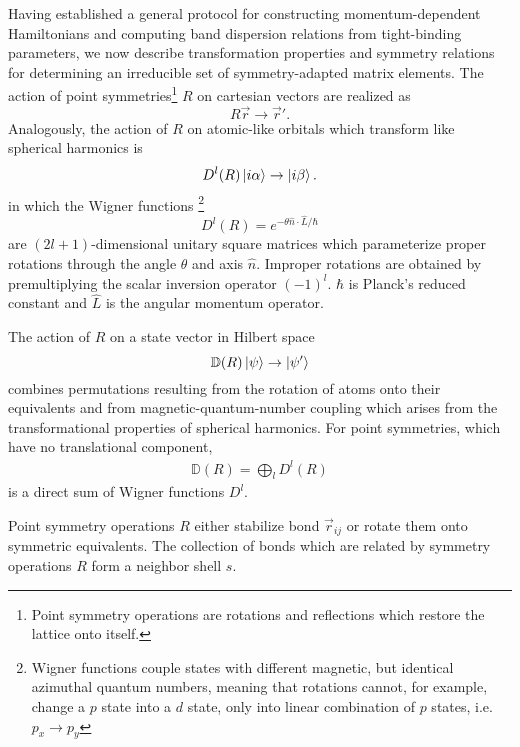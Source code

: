 \documentclass[twocolumn,showpacs,preprintnumbers,superscriptaddress,prb,floatfix,aps,10pt]{revtex4-1}
\newcommand*{\wignerD}{\mathbb{D}}%
\newcommand*{\wignerDl}{D^{l}}%
\newcommand*{\bondvec}{\vec{r}_{ij}}
\begin{document}
Having established a general protocol for constructing momentum-dependent Hamiltonians and computing band dispersion relations from tight-binding parameters, we now describe transformation properties and symmetry relations for determining an irreducible set of symmetry-adapted matrix elements. The action of point symmetries\footnote{Point symmetry operations are rotations and reflections which restore the lattice onto itself.} $R$ on cartesian vectors are realized as
\begin{equation}
R \vec{r} \rightarrow \vec{r} '.
\end{equation}
Analogously, the action of $R$ on atomic-like orbitals which transform like spherical harmonics is
\begin{equation}
\wignerDl(R)\ket{i\alpha} \rightarrow \ket{i\beta}.
\end{equation}
in which the Wigner functions \footnote{Wigner functions couple states with different magnetic, but identical azimuthal quantum numbers, meaning that rotations cannot, for example, change a $p$ state into a $d$ state, only into linear combination of $p$ states, i.e. $p_x \rightarrow p_y$}
\begin{equation}
\wignerDl(R) = e^{- \theta \hat{n} \cdot \hat{L} /\hbar}
\end{equation}
are $(2l+1)$-dimensional unitary square matrices which parameterize proper rotations through the angle $\theta$ and axis $\hat{n}$. Improper rotations are obtained by premultiplying the scalar inversion operator $(-1)^l$. \cite{sharma_general_1979,el-batanouny_symmetry_2008} $\hbar$ is Planck's reduced constant and $\hat{L}$ is the angular momentum operator. %

The action of $R$ on a state vector in Hilbert space
\begin{equation}
\wignerD(R) \ket{\psi} \rightarrow \ket{\psi'}
\end{equation}
combines permutations resulting from the rotation of atoms onto their equivalents and from magnetic-quantum-number coupling which arises from the transformational properties of spherical harmonics. For point symmetries, which have no translational component, 
\begin{align}
\wignerD(R) = \bigoplus_l \wignerDl(R)
\end{align}
%
is a direct sum of Wigner functions $\wignerDl$. 




Point symmetry operations $R$ either stabilize bond $\bondvec$ or rotate them onto symmetric equivalents. The collection of bonds which are related by symmetry operations $R$ form a neighbor shell $s$. 
\end{document}
